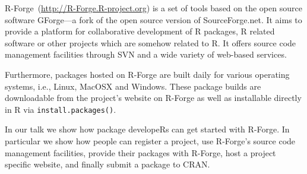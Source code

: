 \documentclass[12pt,a4paper]{article}
\let\code=\texttt
\newcommand{\proglang}[1]{\textsf{#1}}
\begin{document}
\proglang{R}-Forge~(\url{http://R-Forge.R-project.org}) is a set of tools based
on the open source software GForge---a fork of
the open source version of SourceForge.net.
It aims to provide a platform for collaborative development of
\proglang{R} packages, \proglang{R} 
related software or other projects which are somehow related to \proglang{R}.
It offers source code management facilities through SVN and
a wide variety of web-based services.



Furthermore, packages hosted on \proglang{R}-Forge are built daily
for  various operating systems, i.e., Linux, MacOSX and Windows. These
package builds are downloadable from the 
project's website on \proglang{R}-Forge as well as installable 
directly in \proglang{R} via \code{install.packages()}.

In our talk we show how package developeRs can get started with
\proglang{R}-Forge. In particular we show how people can register a project, 
use \proglang{R}-Forge's source code management facilities, provide their
packages with \proglang{R}-Forge, host a project specific website, and
finally submit a package to CRAN.
\end{document}
